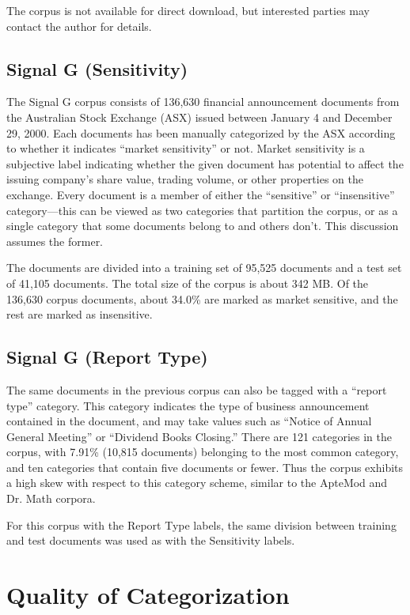 The corpus is not available for direct download, but interested
parties may contact the author for details.


\subsection{Signal G (Sensitivity)}

The Signal G corpus consists of 136,630 financial announcement
documents from the Australian Stock Exchange (ASX)\cite{asx:02} issued
between January 4 and December 29, 2000.  Each documents has been
manually categorized by the ASX according to whether it indicates ``market
sensitivity'' or not.  Market sensitivity is a subjective label indicating
whether the given document has potential to affect the issuing
company's share value, trading volume, or other properties on the
exchange.  Every document is a member of either the ``sensitive'' or
``insensitive'' category---this can be viewed as two categories that
partition the corpus, or as a single category that some documents
belong to and others don't.  This discussion assumes the former.

The documents are divided into a training set of 95,525 documents and a
test set of 41,105 documents.  The total size of the corpus is about
342 MB.  Of the 136,630 corpus documents, about 34.0\% are marked as
market sensitive, and the rest are marked as insensitive.

\subsection{Signal G (Report Type)}

The same documents in the previous corpus can also be tagged with a
``report type'' category.  This category indicates the type of
business announcement contained in the document, and may take values
such as ``Notice of Annual General Meeting'' or ``Dividend Books
Closing.''  There are 121 categories in the corpus, with 7.91\%
(10,815 documents) belonging to the most common category, and ten
categories that contain five documents or fewer.  Thus the corpus
exhibits a high skew with respect to this category scheme, similar to
the ApteMod and Dr. Math corpora.

For this corpus with the Report Type labels, the same division between
training and test documents was used as with the Sensitivity labels.



\section{Quality of Categorization}
\label{Quality}

